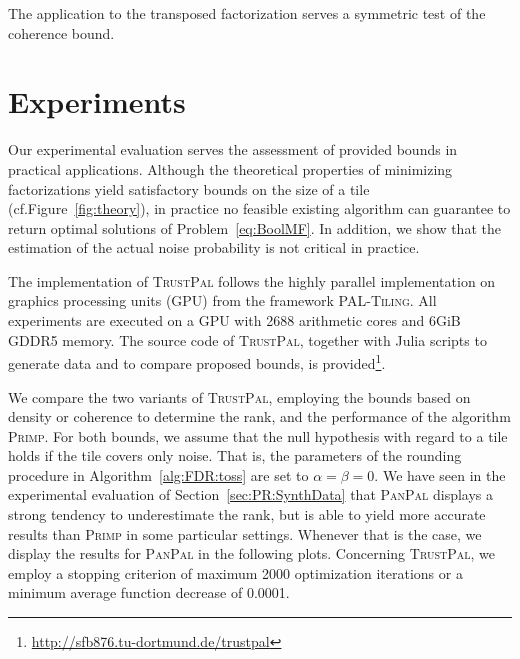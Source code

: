 The application to the transposed factorization serves a symmetric test of the coherence bound. 
\section{Experiments}\label{sec:TP:experiments}
Our experimental evaluation serves the assessment of provided bounds in practical applications. Although the theoretical properties of minimizing factorizations yield satisfactory bounds on the size of a tile (cf.\@ Figure~\ref{fig:theory}), in practice no feasible existing algorithm can guarantee to return optimal solutions of Problem~\eqref{eq:BoolMF}. 
In addition, we show that the estimation of the actual noise probability is not critical in practice.

The implementation of \textsc{TrustPal} follows the highly parallel implementation on graphics processing units (GPU) from the framework \textsc{PAL-Tiling}. All experiments are executed on a GPU with 2688 arithmetic cores and 6GiB GDDR5 memory. The source code of \textsc{TrustPal}, together with Julia scripts to generate data and to compare proposed bounds, is provided\footnote{\url{http://sfb876.tu-dortmund.de/trustpal}}.

We compare the two variants of \textsc{TrustPal}, employing the  bounds based on  density or coherence to determine the rank, and the performance of the algorithm \textsc{Primp}. For both bounds, we assume that the null hypothesis with regard to a tile holds if the tile covers only noise. That is, the parameters of the rounding procedure in Algorithm~\ref{alg:FDR:toss} are set to   $\alpha=\beta=0$. We have seen in the experimental evaluation of Section~\ref{sec:PR:SynthData} that \textsc{PanPal} displays a strong tendency to underestimate the rank, but is able to yield more accurate results than \textsc{Primp} in some particular settings. Whenever that is the case, we display the results for \textsc{PanPal} in the following plots. 
Concerning \textsc{TrustPal}, we employ a stopping criterion of maximum 2000 optimization iterations or a minimum average function decrease of 0.0001. 
